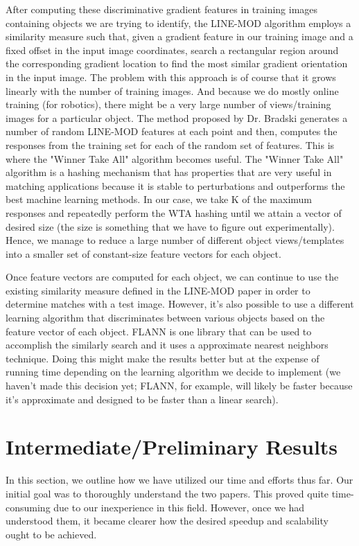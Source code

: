 \documentclass[10pt,twocolumn,letterpaper]{article}
\begin{document}
After computing these discriminative gradient features in training images containing objects we are trying to identify, the LINE-MOD algorithm employs a similarity measure such that, given a gradient feature in our training image and a fixed offset in the input image coordinates, search a rectangular region around the corresponding gradient location to find the most similar gradient orientation in the input image. The problem with this approach is of course that it grows linearly with the number of training images. And because we do mostly online training (for robotics), there might be a very large number of views/training images for a particular object. The method proposed by Dr. Bradski generates a number of random LINE-MOD features at each point and then, computes the responses from the training set for each of the random set of features. This is where the "Winner Take All" algorithm becomes useful. The "Winner Take All" algorithm is a hashing mechanism that has properties that are very useful in matching applications because it is stable to perturbations and outperforms the best machine learning methods. In our case, we take K of the maximum responses and repeatedly perform the WTA hashing until we attain a vector of desired size (the size is something that we have to figure out experimentally). Hence, we manage to reduce a large number of different object views/templates into a smaller set of constant-size feature vectors for each object.

Once feature vectors are computed for each object, we can continue to use the existing similarity measure defined in the LINE-MOD paper in order to determine matches with a test image. However, it's also possible to use a different learning algorithm that discriminates between various objects based on the feature vector of each object. FLANN is one library that can be used to accomplish the similarly search and it uses a approximate nearest neighbors technique. Doing this might make the results better but at the expense of running time depending on the learning algorithm we decide to implement (we haven't made this decision yet; FLANN, for example, will likely be faster because it's approximate and designed to be faster than a linear search).

\section{Intermediate/Preliminary Results}

In this section, we outline how we have utilized our time and efforts thus far. Our initial goal was to thoroughly understand the two papers. This proved quite time-consuming due to our inexperience in this field. However, once we had understood them, it became clearer how the desired speedup and scalability ought to be achieved.
\end{document}
